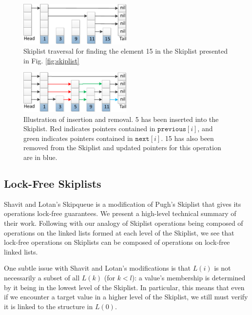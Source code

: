 \documentclass{acm_proc_article-sp}
\begin{document}
\begin{figure}[H]
  \includegraphics[width=0.5\textwidth]{img/skiplistSearch15-crop.pdf}
  \caption{Skiplist traversal for finding the element 15 in the Skiplist presented in Fig. \ref{fig:skiplist}}
  \label{fig:skiplist:search15}
\end{figure}

\begin{figure}[H]
  \includegraphics[width=0.5\textwidth]{img/skiplistInsert5-crop.pdf}
  \caption{Illustration of insertion and removal. 5 has been inserted into the Skiplist. Red indicates pointers contained in $\texttt{previous}[i]$, and green indicates pointers contained in $\texttt{next}[i]$. 15 has also been removed from the Skiplist and updated pointers for this operation are in blue.}
  \label{fig:skiplist:insert5}
\end{figure}

\subsection{Lock-Free Skiplists}
Shavit and Lotan's Skipqueue \cite{shavit00} is a modification
of Pugh's Skiplist that gives its operations lock-free guarantees.
We present a high-level technical summary of their work.
Following with our analogy of Skiplist
operations being composed of operations on the linked lists formed at each level
of the Skiplist, we see that lock-free
operations on Skiplists can be composed of operations on lock-free linked lists.

One subtle issue with Shavit and Lotan's modifications is that $L(i)$ is not necessarily a subset
of all $L(k)$ (for $k < l$): a value's membership is determined by it being
in the lowest level of the Skiplist.
In particular, this means that even if we encounter
a target value in a higher level of the Skiplist, we still must verify it is
linked to the structure in $L(0)$. 
\end{document}
